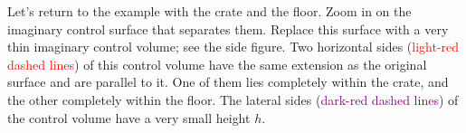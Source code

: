\documentclass[a4paper,12pt,%
onecolumn,oneside,%
british%
]{memoir}
\renewcommand*{\|}[1][]{\nonscript\:#1\vert\nonscript\:\mathopen{}}
\begin{document}
Let's return to the example with the crate and the floor. Zoom in on the imaginary control surface that separates them. Replace this surface with a very thin imaginary control volume; see the side figure. Two horizontal sides (\textcolor{red}{light-red dashed lines}) of this control volume have the same extension as the original surface and are parallel to it. One of them lies completely within the crate, and the other completely within the floor. The lateral sides (\textcolor{purple}{dark-red dashed lines}) of the control volume have a very small height $h$.
%
%
\end{document}
